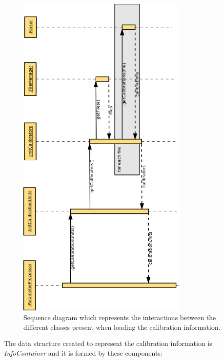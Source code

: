 \begin{figure}[H]
\centerline{\includegraphics[width=0.75\textwidth]{images/InitCalibrationUnitsSequence.png}}
\caption{Sequence diagram which represents the interactions between the different classes present when loading the calibration information.}
\label{f5.3}
\end{figure}


The data structure created to represent the calibration information is \emph{InfoContainer} and it is formed by these components:

